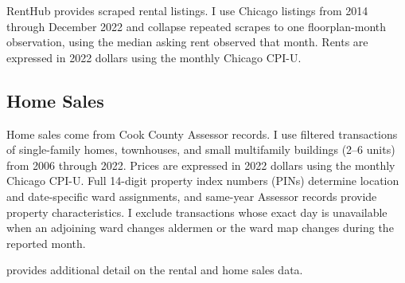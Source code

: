 RentHub provides scraped rental listings.
I use Chicago listings from 2014 through December 2022 and collapse repeated scrapes to one floorplan-month observation, using the median asking rent observed that month.
Rents are expressed in 2022 dollars using the monthly Chicago CPI-U.

\subsection{Home Sales}
\label{subsec:home_sales}

Home sales come from Cook County Assessor records.
I use filtered transactions of single-family homes, townhouses, and small multifamily buildings (2--6 units) from 2006 through 2022.
Prices are expressed in 2022 dollars using the monthly Chicago CPI-U.
Full 14-digit property index numbers (PINs) determine location and date-specific ward assignments, and same-year Assessor records provide property characteristics.
I exclude transactions whose exact day is unavailable when an adjoining ward changes aldermen or the ward map changes during the reported month.

 provides additional detail on the rental and home sales data.
